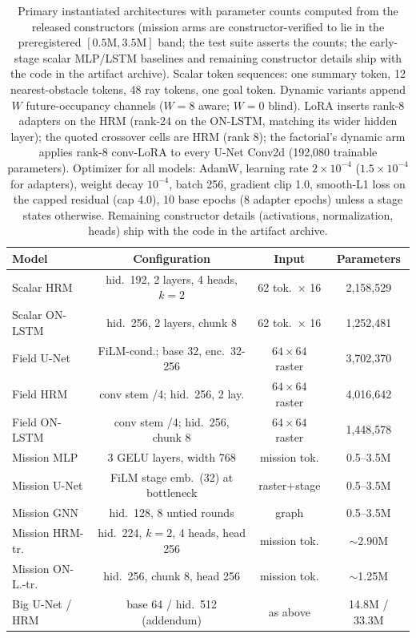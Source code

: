 \documentclass[letterpaper]{article} %
\begin{document}
\begin{table}[t]
\centering
\small
\setlength{\tabcolsep}{1.6pt}
\begin{tabular}{@{}lccc@{}}
\toprule
Model & Configuration & Input & Parameters \\
\midrule
Scalar HRM & hid.\ 192, 2 layers, 4 heads, $k{=}2$ & 62 tok.\ $\times$ 16 & 2{,}158{,}529 \\
Scalar ON-LSTM & hid.\ 256, 2 layers, chunk 8 & 62 tok.\ $\times$ 16 & 1{,}252{,}481 \\
Field U-Net & FiLM-cond.; base 32, enc.\ 32-256 & $64{\times}64$ raster & 3{,}702{,}370 \\
Field HRM & conv stem /4; hid.\ 256, 2 lay. & $64{\times}64$ raster & 4{,}016{,}642 \\
Field ON-LSTM & conv stem /4; hid.\ 256, chunk 8 & $64{\times}64$ raster & 1{,}448{,}578 \\
\midrule
Mission MLP & 3 GELU layers, width 768 & mission tok. & 0.5--3.5M \\
Mission U-Net & FiLM stage emb.\ (32) at bottleneck & raster+stage & 0.5--3.5M \\
Mission GNN & hid.\ 128, 8 untied rounds & graph & 0.5--3.5M \\
Mission HRM-tr. & hid.\ 224, $k{=}2$, 4 heads, head 256 & mission tok. & $\sim$2.90M \\
Mission ON-L.-tr. & hid.\ 256, chunk 8, head 256 & mission tok. & $\sim$1.25M \\
Big U-Net / HRM & base 64 / hid.\ 512 (addendum) & as above & 14.8M / 33.3M \\
\bottomrule
\end{tabular}
\caption{Primary instantiated architectures with parameter counts computed from the released constructors (mission arms are constructor-verified to lie in the preregistered $[0.5\mathrm{M}, 3.5\mathrm{M}]$ band; the test suite asserts the counts; the early-stage scalar MLP/LSTM baselines and remaining constructor details ship with the code in the artifact archive). Scalar token sequences: one summary token, 12 nearest-obstacle tokens, 48 ray tokens, one goal token. Dynamic variants append $W$ future-occupancy channels ($W{=}8$ aware; $W{=}0$ blind). LoRA inserts rank-8 adapters on the HRM (rank-24 on the ON-LSTM, matching its wider hidden layer); the quoted crossover cells are HRM (rank 8); the factorial's dynamic arm applies rank-8 conv-LoRA to every U-Net Conv2d (192{,}080 trainable parameters). Optimizer for all models: AdamW, learning rate $2{\times}10^{-4}$ ($1.5{\times}10^{-4}$ for adapters), weight decay $10^{-4}$, batch 256, gradient clip 1.0, smooth-L1 loss on the capped residual (cap 4.0), 10 base epochs (8 adapter epochs) unless a stage states otherwise. Remaining constructor details (activations, normalization, heads) ship with the code in the artifact archive.}
\label{tab:archspec}
\end{table}
\end{document}
